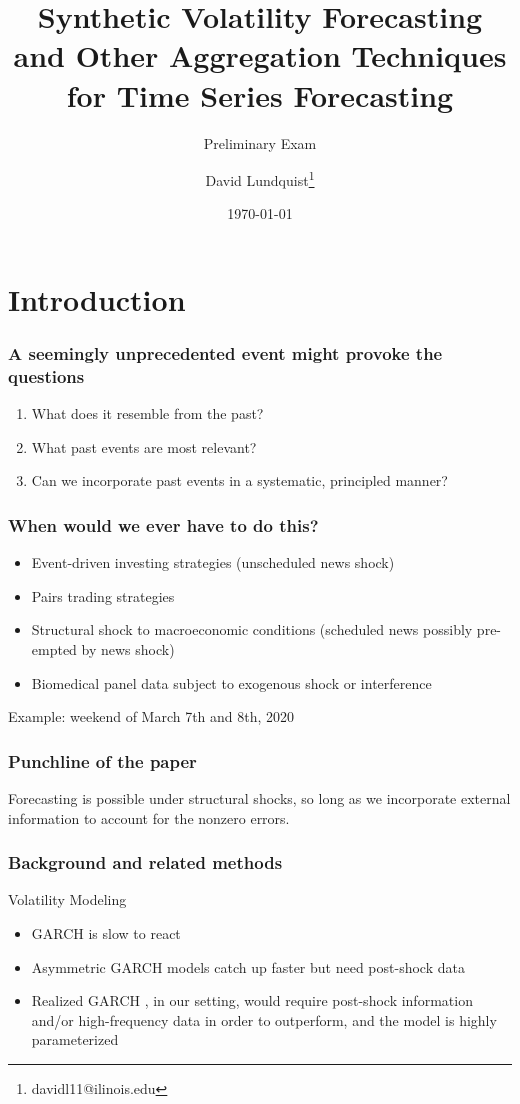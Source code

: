\documentclass{beamer}
\title{Synthetic Volatility Forecasting and Other Aggregation Techniques for Time Series Forecasting}
\subtitle{Preliminary Exam}
\author{David Lundquist\thanks{davidl11@ilinois.edu}}
\date{\today}
\begin{document}
\begin{frame}
\titlepage
\end{frame}

\section{Introduction}

\begin{frame}
\frametitle{A seemingly unprecedented event might provoke the questions}
\begin{enumerate}
    \item What does it resemble from the past?
    \item What past events are most relevant?
    \item Can we incorporate past events in a systematic, principled manner?
\end{enumerate}
\end{frame}

\begin{frame}
    \frametitle{When would we ever have to do this?}

    \begin{itemize}
        \item Event-driven investing strategies (unscheduled news shock)
        \item Pairs trading strategies
        \item Structural shock to macroeconomic conditions (scheduled news possibly pre-empted by news shock)
        \item Biomedical panel data subject to exogenous shock or interference
    \end{itemize}

Example: weekend of March 7th and 8th, 2020

\end{frame}

\begin{frame}
\frametitle{Punchline of the paper}

Forecasting is possible under structural shocks, so long as we incorporate external information to account for the nonzero errors.

\end{frame}

\begin{frame}
    \frametitle{Background and related methods}
    Volatility Modeling

    \begin{itemize}
        \item GARCH is slow to react \parencite[][]{andersen2003modeling}
        \item Asymmetric GARCH models catch up faster but need post-shock data
        \item Realized GARCH \parencite[][]{hansen2012realized}, in our setting, would require post-shock information and/or high-frequency data in order to outperform, and the model is highly parameterized
    \end{itemize}
\end{frame}
\end{document}
